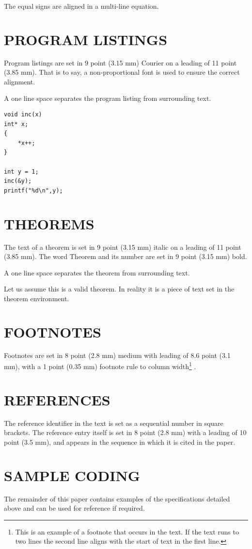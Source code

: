 \documentclass{ecai2012}
\begin{document}
The equal signs are aligned in a multi-line equation.

\section{PROGRAM LISTINGS}
Program listings are set in 9 point (3.15 mm) Courier on a
leading of 11 point (3.85 mm). That is to say, a non-proportional
font is used to ensure the correct alignment.

A one line space separates the program listing from surrounding text.

\begin{verbatim}
void inc(x)
int* x;
{
    *x++;
}

int y = 1;
inc(&y);
printf("%d\n",y);
\end{verbatim}

\section{THEOREMS}
The text of a theorem is set in 9 point (3.15 mm) italic on a
leading of 11 point (3.85 mm). The word Theorem and its number
are set in 9 point (3.15 mm) bold.

A one line space separates the theorem from surrounding text.

\begin{theorem}
Let us assume this is a valid theorem. In reality it is a piece
of text set in the theorem environment.
\end{theorem}

\section{FOOTNOTES}
Footnotes are set in 8 point (2.8 mm) medium with leading of 8.6 point (3.1
mm), with a 1 point (0.35 mm) footnote rule to column
width\footnote{This is an example of a footnote that occurs in
the text. If the text runs to two lines the second line aligns
with the start of text in the first line.} .

\section{REFERENCES}
The reference identifier in the text is set as a sequential number in
square brackets. The reference entry itself is set in 8 point
(2.8 mm) with a leading of 10 point (3.5 mm), and appears
in the sequence in which it is cited in the paper.

\section{SAMPLE CODING}
The remainder of this paper contains examples of the specifications
detailed above and can be used for reference if required.
\end{document}
